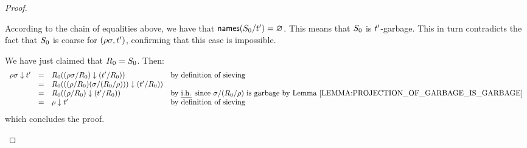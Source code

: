 \begin{proof}
\begin{enumerate}
\begin{enumerate}
    According to the chain of equalities above, we have that $\mathsf{names}(S_0/t') = \varnothing$.
    This means that $S_0$ is $t'$-garbage.
    This in turn contradicts the fact that $S_0$ is coarse for $(\rho\sigma,t')$,
    confirming that this case is impossible.
  \end{enumerate}
  We have just claimed that $R_0 = S_0$.
  Then:
  \[
    \begin{array}{rcll}
    \redseq\redseqtwo \sieve \tm'
    & = & \redex_0((\redseq\redseqtwo/\redex_0) \sieve (\tm'/\redex_0)) & \text{by definition of sieving} \\
    & = & \redex_0(((\redseq/\redex_0)(\redseqtwo/(\redex_0/\redseq))) \sieve (\tm'/\redex_0)) \\
    & = & \redex_0((\redseq/\redex_0) \sieve (\tm'/\redex_0)) & \text{by \ih since $\redseqtwo/(\redex_0/\redseq)$ is garbage by \rlem{projection_of_garbage_is_garbage}} \\
    & = & \redseq \sieve \tm' & \text{by definition of sieving}
    \end{array}
  \]
  which concludes the proof.
\end{enumerate}
\end{proof}
